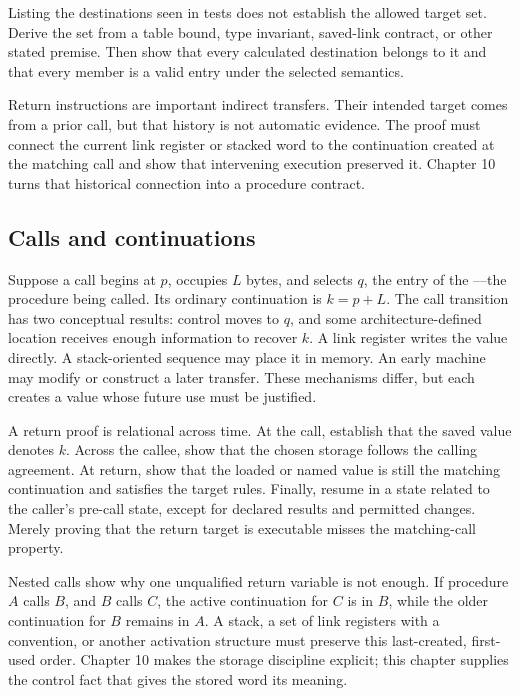 \begin{warning}[title={A finite target set needs provenance}]
Listing the destinations seen in tests does not establish the allowed target
set. Derive the set from a table bound, type invariant, saved-link contract, or
other stated premise. Then show that every calculated destination belongs to it
and that every member is a valid entry under the selected semantics.
\end{warning}

Return instructions are important indirect transfers. Their intended target
comes from a prior call, but that history is not automatic evidence. The proof
must connect the current link register or stacked word to the continuation
created at the matching call and show that intervening execution preserved it.
Chapter 10 turns that historical connection into a procedure contract.

\subsection{Calls and continuations}

Suppose a call begins at \(p\), occupies \(L\) bytes, and selects \(q\), the
entry of the ---the procedure being called. Its ordinary
continuation is \(k=p+L\). The call transition has two
conceptual results: control moves to \(q\), and some architecture-defined
location receives enough information to recover \(k\). A link register writes
the value directly. A stack-oriented sequence may place it in memory. An early
machine may modify or construct a later transfer. These mechanisms differ,
but each creates a value whose future use must be justified.

A return proof is relational across time. At the call, establish that the saved
value denotes \(k\). Across the callee, show that the chosen storage follows
the calling agreement. At return, show that the loaded or named value is still
the matching continuation and satisfies the target rules. Finally, resume in a
state related to the caller's pre-call state, except for declared results and
permitted changes. Merely proving that the return target is executable misses
the matching-call property.

Nested calls show why one unqualified return variable is not enough. If
procedure \(A\) calls \(B\), and \(B\) calls \(C\), the active continuation
for \(C\) is in \(B\), while the older continuation for \(B\) remains in
\(A\). A stack, a set of link registers with a convention, or another
activation structure must preserve this last-created, first-used order.
Chapter 10 makes the storage discipline explicit; this chapter supplies the
control fact that gives the stored word its meaning.

